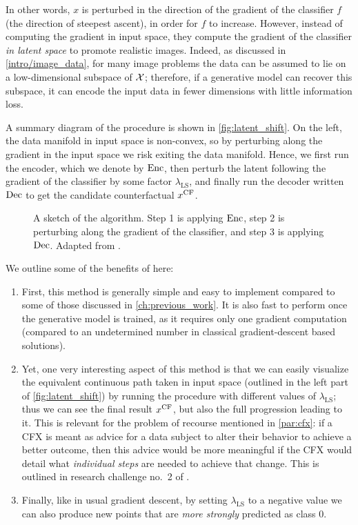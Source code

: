 \documentclass[../main.tex]{subfiles}
\begin{document}
In other words, $x$ is perturbed in the direction of the gradient of the classifier $f$ (the direction of steepest ascent), in order for $f$ to increase.
However, instead of computing the gradient in input space, they compute the gradient of the classifier \emph{in latent space} to promote realistic images.
Indeed, as discussed in \autoref{intro/image_data}, for many image problems the data can be assumed to lie on a low-dimensional subspace of $\mathcal{X}$; therefore, if a generative model can recover this subspace, it can encode the input data in fewer dimensions with little information loss.

A summary diagram of the \ls{} procedure is shown in \autoref{fig:latent_shift}.
On the left, the data manifold in input space is non-convex, so by perturbing along the gradient in the input space we risk exiting the data manifold.
Hence, we first run the encoder, which we denote by $\operatorname{Enc}$, then perturb the latent following the gradient of the classifier by some factor $\lambda_\text{LS}$, and finally run the decoder written $\operatorname{Dec}$ to get the candidate counterfactual $x^\mathrm{CF}$.

\begin{figure}[htbp]
	\centering

	\caption{A sketch of the \ls{} algorithm. Step 1 is applying $\operatorname{Enc}$, step 2 is perturbing along the gradient of the classifier, and step 3 is applying $\operatorname{Dec}$. Adapted from \cite{cohenGifsplanation2022}.}
	\label{fig:latent_shift}
\end{figure}

We outline some of the benefits of \ls{} here:

\begin{enumerate}
	\item First, this method is generally simple and easy to implement compared to some of those discussed in \autoref{ch:previous_work}.
	      It is also fast to perform once the generative model is trained, as it requires only one gradient computation (compared to an undetermined number in classical gradient-descent based solutions).

	\item Yet, one very interesting aspect of this method is that we can easily visualize the equivalent continuous path taken in input space (outlined in the left part of \autoref{fig:latent_shift}) by running the procedure with different values of $\lambda_\text{LS}$; thus we can see the final result $x^\mathrm{CF}$, but also the full progression leading to it.
	      This is relevant for the problem of recourse mentioned in \autoref{par:cfx}: if a CFX is meant as advice for a data subject to alter their behavior to achieve a better outcome, then this advice would be more meaningful if the CFX would detail what \emph{individual steps} are needed to achieve that change.
	      This is outlined in research challenge no.~2 of \cite{vermaCounterfactual2020}.

	\item Finally, like in usual gradient descent, by setting $\lambda_\text{LS}$ to a negative value we can also produce new points that are \emph{more strongly} predicted as class 0.
\end{enumerate}
\end{document}
